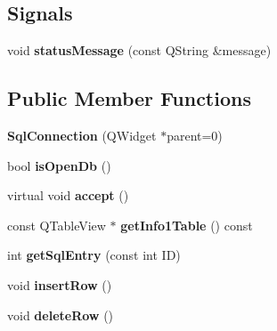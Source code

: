 \subsection*{Signals}
\begin{DoxyCompactItemize}
\item 
\hypertarget{classSqlConnection_add3790e6a432367e0df8774d952a74da}{void {\bfseries status\+Message} (const Q\+String \&message)}\label{classSqlConnection_add3790e6a432367e0df8774d952a74da}

\end{DoxyCompactItemize}
\subsection*{Public Member Functions}
\begin{DoxyCompactItemize}
\item 
\hypertarget{classSqlConnection_ad936fc98369d3e3f0471aee180d8a80a}{{\bfseries Sql\+Connection} (Q\+Widget $\ast$parent=0)}\label{classSqlConnection_ad936fc98369d3e3f0471aee180d8a80a}

\item 
\hypertarget{classSqlConnection_a2f0318c01899357ce4a3092e2993f6d3}{bool {\bfseries is\+Open\+Db} ()}\label{classSqlConnection_a2f0318c01899357ce4a3092e2993f6d3}

\item 
\hypertarget{classSqlConnection_aa03f1185085e3f8607bcf1f607a60a22}{virtual void {\bfseries accept} ()}\label{classSqlConnection_aa03f1185085e3f8607bcf1f607a60a22}

\item 
\hypertarget{classSqlConnection_a9279e66a9187e4fc47b00b8883085352}{const Q\+Table\+View $\ast$ {\bfseries get\+Info1\+Table} () const }\label{classSqlConnection_a9279e66a9187e4fc47b00b8883085352}

\item 
\hypertarget{classSqlConnection_ac12be705fcd20869aeca038b5de97136}{int {\bfseries get\+Sql\+Entry} (const int I\+D)}\label{classSqlConnection_ac12be705fcd20869aeca038b5de97136}

\item 
\hypertarget{classSqlConnection_a12cb9b234c9c46517015232d3e712203}{void {\bfseries insert\+Row} ()}\label{classSqlConnection_a12cb9b234c9c46517015232d3e712203}

\item 
\hypertarget{classSqlConnection_a2f7155fdf28187d4328c28b0ead736e7}{void {\bfseries delete\+Row} ()}\label{classSqlConnection_a2f7155fdf28187d4328c28b0ead736e7}


\end{DoxyCompactItemize}
